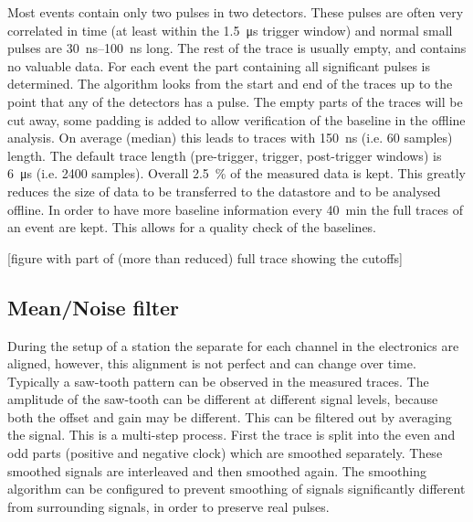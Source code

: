 Most events contain only two pulses in two detectors. These pulses are often very correlated in time (at least within the \SI{1.5}{\micro\second} trigger window) and normal small pulses are \SIrange{30}{100}{\ns} long. The rest of the trace is usually empty, and contains no valuable data. For each event the part containing all significant pulses is determined. The algorithm looks from the start and end of the traces up to the point that any of the detectors has a pulse. The empty parts of the traces will be cut away, some padding is added to allow verification of the baseline in the offline analysis. On average (median) this leads to traces with \SI{150}{\ns} (i.e. 60 samples) length. The default trace length (pre-trigger, trigger, post-trigger windows) is \SI{6}{\micro\second} (i.e. 2400 samples). Overall \SI{2.5}{\percent} of the measured data is kept. This greatly reduces the size of data to be transferred to the datastore and to be analysed offline. In order to have more baseline information every \SI{40}{\minute} the full traces of an event are kept. This allows for a quality check of the baselines.

[figure with part of (more than reduced) full trace showing the cutoffs]



\subsection{Mean/Noise filter}

During the setup of a station the separate \adcs for each channel in the \hisparc electronics are aligned, however, this alignment is not perfect and can change over time. Typically a saw-tooth pattern can be observed in the measured traces. The amplitude of the saw-tooth can be different at different signal levels, because both the offset and gain may be different. This can be filtered out by averaging the signal. This is a multi-step process. First the trace is split into the even and odd parts (positive and negative clock) which are smoothed separately. These smoothed signals are interleaved and then smoothed again. The smoothing algorithm can be configured to prevent smoothing of signals significantly different from surrounding signals, in order to preserve real pulses.

